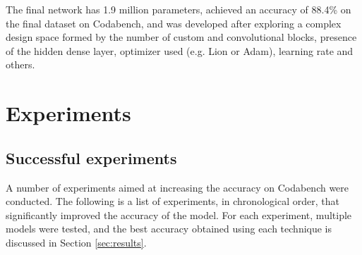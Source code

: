 \documentclass[11pt]{article}
\begin{document}
\begin{multicols}{2}
      The final network has 1.9 million parameters, achieved an accuracy of 88.4\% on the final dataset on Codabench, and was developed after exploring a complex design space formed by the number of custom and convolutional blocks, presence of the hidden dense layer, optimizer used (e.g. Lion or Adam), learning rate and others.

      \label{sec:experiments}
      \section{Experiments}


      \subsection{Successful experiments}

      A number of experiments aimed at increasing the accuracy on Codabench were conducted. The following is a list of experiments, in chronological order, that significantly improved the accuracy of the model. For each experiment, multiple models were tested, and the best accuracy obtained using each technique is discussed in Section 
      \ref{sec:results}.


\end{multicols}
\end{document}
